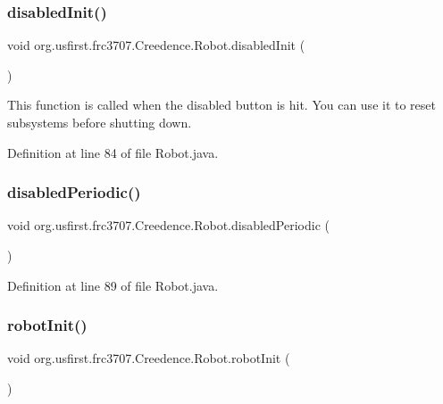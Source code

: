 \subsubsection{\texorpdfstring{disabledInit()}{disabledInit()}}
{\footnotesize\ttfamily void org.\+usfirst.\+frc3707.\+Creedence.\+Robot.\+disabled\+Init (\begin{DoxyParamCaption}{ }\end{DoxyParamCaption})}

This function is called when the disabled button is hit. You can use it to reset subsystems before shutting down. 

Definition at line 84 of file Robot.\+java.

\mbox{\label{classorg_1_1usfirst_1_1frc3707_1_1_creedence_1_1_robot_acde68be5df7e5eecda8456a660ff79e2}} 
\subsubsection{\texorpdfstring{disabledPeriodic()}{disabledPeriodic()}}
{\footnotesize\ttfamily void org.\+usfirst.\+frc3707.\+Creedence.\+Robot.\+disabled\+Periodic (\begin{DoxyParamCaption}{ }\end{DoxyParamCaption})}



Definition at line 89 of file Robot.\+java.

\mbox{\label{classorg_1_1usfirst_1_1frc3707_1_1_creedence_1_1_robot_a7307806783815b6f22926b44074349c5}} 
\subsubsection{\texorpdfstring{robotInit()}{robotInit()}}
{\footnotesize\ttfamily void org.\+usfirst.\+frc3707.\+Creedence.\+Robot.\+robot\+Init (\begin{DoxyParamCaption}{ }\end{DoxyParamCaption})}

